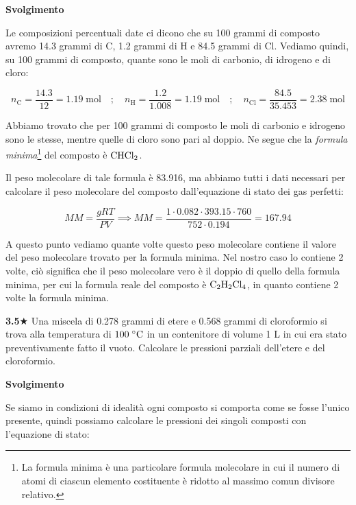 \vspace{0.2cm}\large\textbf{Svolgimento}\normalsize

\vspace{0.2cm}Le composizioni percentuali date ci dicono che su 100 grammi di composto avremo 14.3 grammi di C, 1.2 grammi di H e 84.5 grammi di Cl. Vediamo quindi, su 100 grammi di composto, quante sono le moli di carbonio, di idrogeno e di cloro:

$$n_{\text{C}}=\frac{14.3}{12}=1.19 \; \text{mol}
\quad;\quad
n_{\text{H}}=\frac{1.2}{1.008}=1.19 \; \text{mol}
\quad;\quad
n_{\text{Cl}}=\frac{84.5}{35.453}=2.38 \; \text{mol}$$

Abbiamo trovato che per 100 grammi di composto le moli di carbonio e idrogeno sono le stesse, mentre quelle di cloro sono pari al doppio. Ne segue che la \textit{formula minima}\footnote{La formula minima è una particolare formula molecolare in cui il numero di atomi di ciascun elemento costituente è ridotto al massimo comun divisore relativo.} del composto è $\rm CHCl_2$.

Il peso molecolare di tale formula è 83.916, ma abbiamo tutti i dati necessari per calcolare il peso molecolare del composto dall'equazione di stato dei gas perfetti:

$$MM=\frac{gRT}{PV} \implies MM=\frac{1 \cdot 0.082 \cdot 393.15 \cdot 760}{752 \cdot 0.194}=167.94$$

A questo punto vediamo quante volte questo peso molecolare contiene il valore del peso molecolare trovato per la formula minima. Nel nostro caso lo contiene 2 volte, ciò significa che il peso molecolare vero è il doppio di quello della formula minima, per cui la formula reale del composto è $\rm C_2H_2Cl_4$, in quanto contiene 2 volte la formula minima.

\vspace{0.2cm}\textbf{3.5}$\bigstar$ Una miscela di 0.278 grammi di etere e 0.568 grammi di cloroformio si trova alla temperatura di $100 \; \rm ^{\circ}C$ in un contenitore di volume 1 L in cui era stato preventivamente fatto il vuoto. Calcolare le pressioni parziali dell'etere e del cloroformio.

\vspace{0.2cm}\large\textbf{Svolgimento}\normalsize

\vspace{0.2cm}Se siamo in condizioni di idealità ogni composto si comporta come se fosse l'unico presente, quindi possiamo calcolare le pressioni dei singoli composti con l'equazione di stato:

